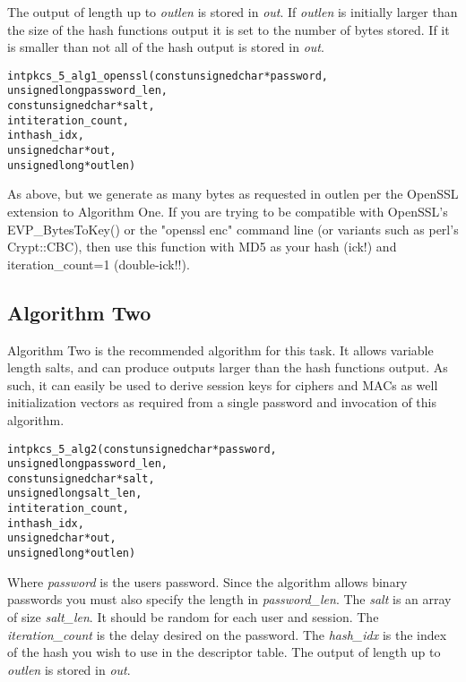 \documentclass[synpaper]{book}
\begin{document}
The output of length up to \textit{outlen} is stored in \textit{out}.  If \textit{outlen} is initially larger than the size of the hash functions output
it is set to the number of bytes stored.  If it is smaller than not all of the hash output is stored in \textit{out}.

\begin{alltt}
int pkcs_5_alg1_openssl(const unsigned char *password,
                      unsigned long  password_len,
                const unsigned char *salt,
                                int  iteration_count,
                                int  hash_idx,
                      unsigned char *out,
                      unsigned long *outlen)
\end{alltt}
As above, but we generate as many bytes as requested in outlen per the OpenSSL extension to Algorithm One.  If you are trying to be compatible with OpenSSL's EVP\_BytesToKey() or the "openssl enc" command line (or variants such as perl's Crypt::CBC), then use this function with MD5 as your hash (ick!) and iteration\_count=1 (double-ick!!).
\subsection{Algorithm Two}

Algorithm Two is the recommended algorithm for this task.  It allows variable length salts, and can produce outputs larger than the
hash functions output.  As such, it can easily be used to derive session keys for ciphers and MACs as well initialization vectors as required
from a single password and invocation of this algorithm.

\begin{alltt}
int pkcs_5_alg2(const unsigned char *password,
                      unsigned long  password_len,
                const unsigned char *salt,
                      unsigned long  salt_len,
                                int  iteration_count,
                                int  hash_idx,
                      unsigned char *out,
                      unsigned long *outlen)
\end{alltt}
Where \textit{password} is the users password.  Since the algorithm allows binary passwords you must also specify the length in \textit{password\_len}.
The \textit{salt} is an array of size \textit{salt\_len}.  It should be random for each user and session.  The \textit{iteration\_count} is the delay desired
on the password.  The \textit{hash\_idx} is the index of the hash you wish to use in the descriptor table.   The output of length up to
\textit{outlen} is stored in \textit{out}.
\end{document}
